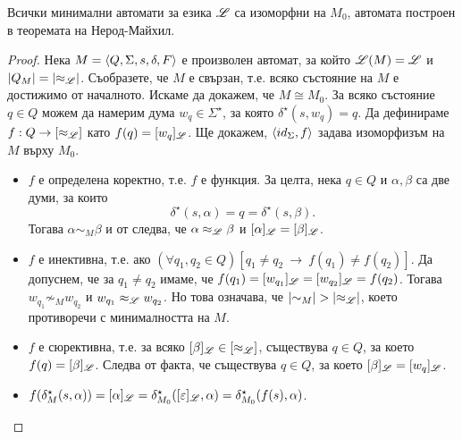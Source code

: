 \begin{cor}
  Всички минимални автомати за езика $\mathscr{L}$ са изоморфни на $M_0$, автомата построен в теоремата на Нерод-Майхил.
\end{cor}
\begin{proof}
  Нека $M = \langle{Q,\Sigma,s,\delta,F}\rangle$ е произволен автомат, за който $\mathscr{L}(M) = \mathscr{L}$ и $\vert{Q_M}\vert = \vert{\approx_{\mathscr{L}}}\vert$.
  Съобразете, че $M$ е свързан, т.е. всяко състояние на $M$ е достижимо от началното.
  Искаме да докажем, че $M \cong M_0$.
  За всяко състояние $q\in Q$ можем да намерим дума $w_q\in\Sigma^\star$,
  за която $\delta^\star(s,w_q) = q$.
  Да дефинираме $f:Q\to [\approx_{\mathscr{L}}]$ като $f(q) = [w_q]_{\mathscr{L}}$. Ще докажем, 
  $\langle{id_\Sigma, f}\rangle$ задава изоморфизъм на $M$ върху $M_0$.
  \begin{itemize}
  \item
    $f$ е определена коректно, т.е. $f$ е функция.
    За целта, нека $q\in Q$ и $\alpha,\beta$ са две думи, за които
    \[\delta^\star(s,\alpha) = q = \delta^\star(s,\beta).\]
    Тогава $\alpha\sim_M \beta$ и от  следва, 
    че $\alpha \approx_{\mathscr{L}} \beta$ и $[\alpha]_{\mathscr{L}} = [\beta]_{\mathscr{L}}$.
  \item
    $f$ е инективна, т.е. ако $(\forall q_1,q_2 \in Q)[q_1\neq q_2\ \rightarrow\ f(q_1) \neq f(q_2)]$.
    Да допуснем, че за $q_1 \neq q_2$ имаме, че $f(q_1) = [w_{q_1}]_{\mathscr{L}} = [w_{q_2}]_{\mathscr{L}} = f(q_2)$.
    Тогава $w_{q_1} \not\sim_M w_{q_2}$ и $w_{q_1} \approx_{\mathscr{L}} w_{q_2}$.
    Но това означава, че $\vert{\sim_M}\vert > \vert{\approx_{\mathscr{L}}}\vert$,
    което противоречи с минималността на $M$.
  \item
    $f$ е сюрективна, т.е. за всяко $[\beta]_{\mathscr{L}} \in [\approx_{\mathscr{L}}]$, съществува $q \in Q$, за което $f(q) = [\beta]_{\mathscr{L}}$.
    Следва от факта, че съществува $q \in Q$, за което $[\beta]_{\mathscr{L}} = [w_q]_{\mathscr{L}}$.
  \item
    $f(\delta^\star_M(s,\alpha)) = [\alpha]_{\mathscr{L}} = \delta^\star_{M_0}([\varepsilon]_{\mathscr{L}}, \alpha) = 
    \delta^\star_{M_0}(f(s), \alpha)$.
  \end{itemize}
\end{proof}


